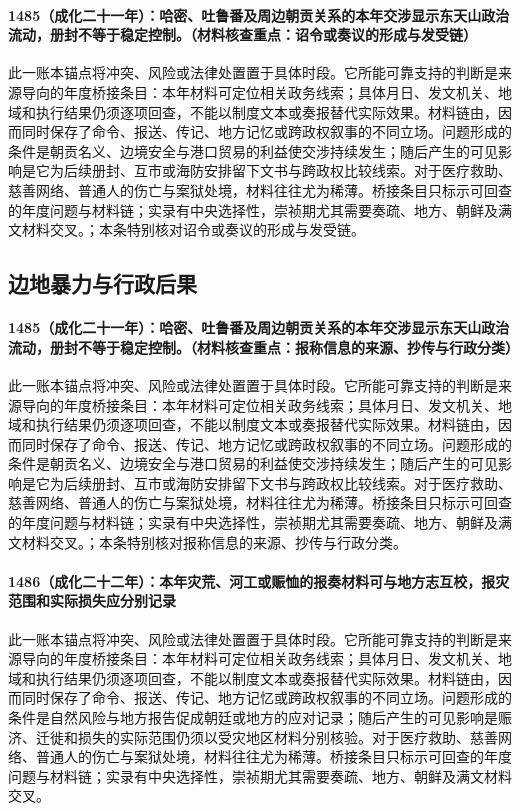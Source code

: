 \paragraph{1485（成化二十一年）：哈密、吐鲁番及周边朝贡关系的本年交涉显示东天山政治流动，册封不等于稳定控制。（材料核查重点：诏令或奏议的形成与发受链）} 此一账本锚点将冲突、风险或法律处置置于具体时段。它所能可靠支持的判断是来源导向的年度桥接条目：本年材料可定位相关政务线索；具体月日、发文机关、地域和执行结果仍须逐项回查，不能以制度文本或奏报替代实际效果。材料链由，因而同时保存了命令、报送、传记、地方记忆或跨政权叙事的不同立场。问题形成的条件是朝贡名义、边境安全与港口贸易的利益使交涉持续发生；随后产生的可见影响是它为后续册封、互市或海防安排留下文书与跨政权比较线索。对于医疗救助、慈善网络、普通人的伤亡与案狱处境，材料往往尤为稀薄。桥接条目只标示可回查的年度问题与材料链；实录有中央选择性，崇祯期尤其需要奏疏、地方、朝鲜及满文材料交叉。；本条特别核对诏令或奏议的形成与发受链。

\subsection{边地暴力与行政后果}

\paragraph{1485（成化二十一年）：哈密、吐鲁番及周边朝贡关系的本年交涉显示东天山政治流动，册封不等于稳定控制。（材料核查重点：报称信息的来源、抄传与行政分类）} 此一账本锚点将冲突、风险或法律处置置于具体时段。它所能可靠支持的判断是来源导向的年度桥接条目：本年材料可定位相关政务线索；具体月日、发文机关、地域和执行结果仍须逐项回查，不能以制度文本或奏报替代实际效果。材料链由，因而同时保存了命令、报送、传记、地方记忆或跨政权叙事的不同立场。问题形成的条件是朝贡名义、边境安全与港口贸易的利益使交涉持续发生；随后产生的可见影响是它为后续册封、互市或海防安排留下文书与跨政权比较线索。对于医疗救助、慈善网络、普通人的伤亡与案狱处境，材料往往尤为稀薄。桥接条目只标示可回查的年度问题与材料链；实录有中央选择性，崇祯期尤其需要奏疏、地方、朝鲜及满文材料交叉。；本条特别核对报称信息的来源、抄传与行政分类。

\paragraph{1486（成化二十二年）：本年灾荒、河工或赈恤的报奏材料可与地方志互校，报灾范围和实际损失应分别记录} 此一账本锚点将冲突、风险或法律处置置于具体时段。它所能可靠支持的判断是来源导向的年度桥接条目：本年材料可定位相关政务线索；具体月日、发文机关、地域和执行结果仍须逐项回查，不能以制度文本或奏报替代实际效果。材料链由，因而同时保存了命令、报送、传记、地方记忆或跨政权叙事的不同立场。问题形成的条件是自然风险与地方报告促成朝廷或地方的应对记录；随后产生的可见影响是赈济、迁徙和损失的实际范围仍须以受灾地区材料分别核验。对于医疗救助、慈善网络、普通人的伤亡与案狱处境，材料往往尤为稀薄。桥接条目只标示可回查的年度问题与材料链；实录有中央选择性，崇祯期尤其需要奏疏、地方、朝鲜及满文材料交叉。

